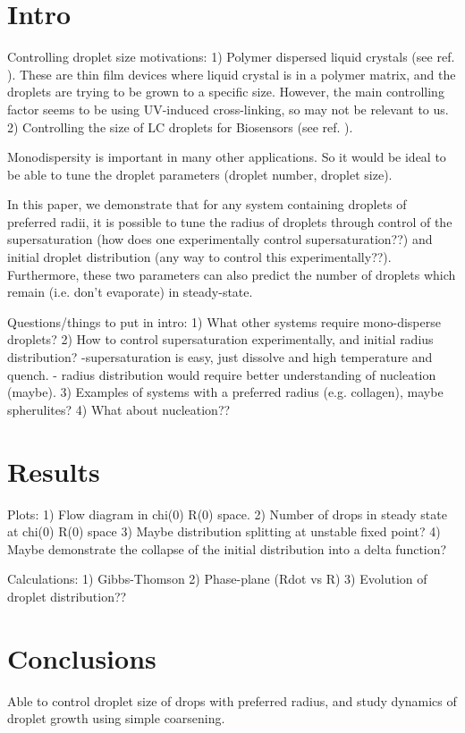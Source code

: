 \documentclass[12pt]{article}
\begin{document}

\section{Intro}
Controlling droplet size motivations:
1) Polymer dispersed liquid crystals (see ref. \cite{ohta:2012gd}). These are thin film devices where liquid crystal is in a polymer matrix, and the droplets are trying to be grown to a specific size. However, the main controlling factor seems to be using UV-induced cross-linking, so may not be relevant to us.
2) Controlling the size of LC droplets for Biosensors (see ref. \cite{Lee:2016hd}).

Monodispersity is important in many other applications. So it would be ideal to be able to tune the droplet parameters (droplet number, droplet size).

In this paper, we demonstrate that for any system containing droplets of preferred radii, it is possible to tune the radius of droplets through control of the supersaturation (how does one experimentally control supersaturation??) and initial droplet distribution (any way to control this experimentally??). Furthermore, these two parameters can also predict the number of droplets which remain (i.e. don't evaporate) in steady-state.

Questions/things to put in intro:
1) What other systems require mono-disperse droplets?
2) How to control supersaturation experimentally, and initial radius distribution?
-supersaturation is easy, just dissolve and high temperature and quench.
- radius distribution would require better understanding of nucleation (maybe).
3) Examples of systems with a preferred radius (e.g. collagen), maybe spherulites?
4) What about nucleation??

\section{Results}

Plots:
1) Flow diagram in chi(0) R(0) space.
2) Number of drops in steady state at chi(0) R(0) space
3) Maybe distribution splitting at unstable fixed point?
4) Maybe demonstrate the collapse of the initial distribution into a delta function?

Calculations:
1) Gibbs-Thomson
2) Phase-plane (Rdot vs R)
3) Evolution of droplet distribution??

\section{Conclusions}
Able to control droplet size of drops with preferred radius, and study dynamics of droplet growth using simple coarsening.

\clearpage


\end{document}
